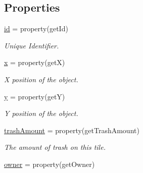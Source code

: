 \subsection*{\-Properties}
\begin{DoxyCompactItemize}
\item 
\hypertarget{classGameObject_1_1Tile_a768279e6e50e74bcd25ee22ca26142dd}{\hyperlink{classGameObject_1_1Tile_a768279e6e50e74bcd25ee22ca26142dd}{id} = property(get\-Id)}\label{classGameObject_1_1Tile_a768279e6e50e74bcd25ee22ca26142dd}

\begin{DoxyCompactList}\small\item\em \-Unique \-Identifier. \end{DoxyCompactList}\item 
\hypertarget{classGameObject_1_1Tile_a04d36d84c3a80d029570cdfbe4c23602}{\hyperlink{classGameObject_1_1Tile_a04d36d84c3a80d029570cdfbe4c23602}{x} = property(get\-X)}\label{classGameObject_1_1Tile_a04d36d84c3a80d029570cdfbe4c23602}

\begin{DoxyCompactList}\small\item\em \-X position of the object. \end{DoxyCompactList}\item 
\hypertarget{classGameObject_1_1Tile_a1167e00ea9562c3837b39a882ab9b594}{\hyperlink{classGameObject_1_1Tile_a1167e00ea9562c3837b39a882ab9b594}{y} = property(get\-Y)}\label{classGameObject_1_1Tile_a1167e00ea9562c3837b39a882ab9b594}

\begin{DoxyCompactList}\small\item\em \-Y position of the object. \end{DoxyCompactList}\item 
\hypertarget{classGameObject_1_1Tile_ad753076e7aa041f01cb7647a676ff376}{\hyperlink{classGameObject_1_1Tile_ad753076e7aa041f01cb7647a676ff376}{trash\-Amount} = property(get\-Trash\-Amount)}\label{classGameObject_1_1Tile_ad753076e7aa041f01cb7647a676ff376}

\begin{DoxyCompactList}\small\item\em \-The amount of trash on this tile. \end{DoxyCompactList}\item 
\hypertarget{classGameObject_1_1Tile_a5732ef68c22553a69481ea4d75a69506}{\hyperlink{classGameObject_1_1Tile_a5732ef68c22553a69481ea4d75a69506}{owner} = property(get\-Owner)}\label{classGameObject_1_1Tile_a5732ef68c22553a69481ea4d75a69506}


\end{DoxyCompactItemize}
